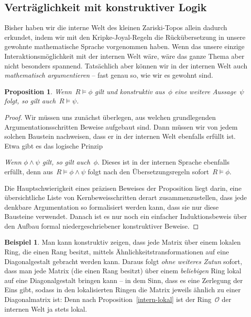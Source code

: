 \documentclass[a4paper,ngerman,12pt]{scrartcl}
\theoremstyle{definition}
\newtheorem{bsp}[defn]{Beispiel}
\theoremstyle{plain}
\newtheorem{prop}[defn]{Proposition}
\theoremstyle{remark}
\renewcommand{\O}{\mathcal{O}}
\renewcommand{\_}{\mathpunct{.}\,}
\newcommand{\?}{\,{:}\,}
\newenvironment{indentblock}{%
  \list{}{\leftmargin\leftmargin}%
  \item\relax
}{%
  \endlist
}
\begin{document}
\subsection{Verträglichkeit mit konstruktiver Logik}

Bisher haben wir die interne Welt des kleinen Zariski-Topos allein dadurch
erkundet, indem wir mit den Kripke-Joyal-Regeln die Rückübersetzung in unsere
gewohnte mathematische Sprache vorgenommen haben. Wenn das unsere einzige
Interaktionsmöglichkeit mit der internen Welt wäre, wäre das ganze Thema aber nicht
besonders spannend. Tatsächlich aber können wir in der internen Welt auch
\emph{mathematisch argumentieren} -- fast genau so, wie wir es gewohnt sind.

\begin{prop}\label{soundness}%
Wenn~$R \models \phi$ gilt und konstruktiv aus~$\phi$ eine weitere
Aussage~$\psi$ folgt, so gilt auch~$R \models \psi$.\end{prop}
\begin{proof}Wir müssen uns
zunächst überlegen, aus welchen grundlegenden Argumentationsschritten Beweise
aufgebaut sind. Dann müssen wir von jedem solchen Baustein nachweisen,
dass er in der internen Welt ebenfalls erfüllt ist. Etwa gibt es das logische
Prinzip
\begin{indentblock}\emph{Wenn $\phi \wedge \psi$ gilt, so gilt auch~$\phi$}.
\end{indentblock}
Dieses ist in der internen Sprache ebenfalls erfüllt, denn aus~$R \models \phi
\wedge \psi$ folgt nach den Übersetzungsregeln sofort~$R \models \phi$.

Die Hauptschwierigkeit eines präzisen Beweises der Proposition liegt darin,
eine über\-sicht\-li\-che Liste von Kernbeweisschritten derart zusammenzustellen,
dass jede denkbare Argumentation so formalisiert werden kann, dass sie nur diese
Bausteine verwendet. Danach ist es nur noch ein einfacher Induktionsbeweis über den
Aufbau formal niedergeschriebener konstruktiver Beweise.
\end{proof}

\begin{bsp}Man kann konstruktiv zeigen, dass jede Matrix über einem lokalen
Ring, die einen Rang besitzt, mittels Ähnlichkeitstransformationen auf eine
Diagonalgestalt gebracht werden kann. Daraus folgt \emph{ohne weiteres Zutun}
sofort, dass man jede Matrix (die einen Rang besitzt) über einem
\emph{beliebigen} Ring lokal auf eine Diagonalgestalt bringen kann -- in dem Sinn, dass es
eine Zerlegung der Eins gibt, sodass in den lokalisierten Ringen die Matrix
jeweils ähnlich zu einer Diagonalmatrix ist: Denn nach Proposition~\ref{intern-lokal}
ist der Ring~$\O$ der internen Welt ja stets lokal.\end{bsp}
\end{document}
